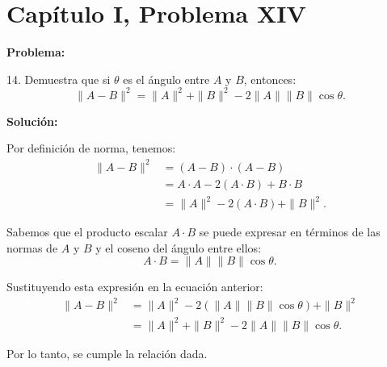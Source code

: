 \section*{Capítulo I, Problema XIV}

\textbf{Problema:}

14. Demuestra que si $\theta$ es el ángulo entre $A$ y $B$, entonces:
\[
    \|A - B\|^2 = \|A\|^2 + \|B\|^2 - 2\|A\|\|B\| \cos \theta.
\]

\textbf{Solución:}

Por definición de norma, tenemos:
\begin{align*}
    \|A - B\|^2 &= (A - B) \cdot (A - B) \\
    &= A \cdot A - 2(A \cdot B) + B \cdot B \\
    &= \|A\|^2 - 2(A \cdot B) + \|B\|^2.
\end{align*}

Sabemos que el producto escalar $A \cdot B$ se puede expresar en términos de las normas de $A$ y $B$ y el coseno del ángulo entre ellos:
\[
    A \cdot B = \|A\|\|B\| \cos \theta.
\]

Sustituyendo esta expresión en la ecuación anterior:
\begin{align*}
    \|A - B\|^2 &= \|A\|^2 - 2(\|A\|\|B\| \cos \theta) + \|B\|^2 \\
    &= \|A\|^2 + \|B\|^2 - 2\|A\|\|B\| \cos \theta.
\end{align*}

Por lo tanto, se cumple la relación dada.